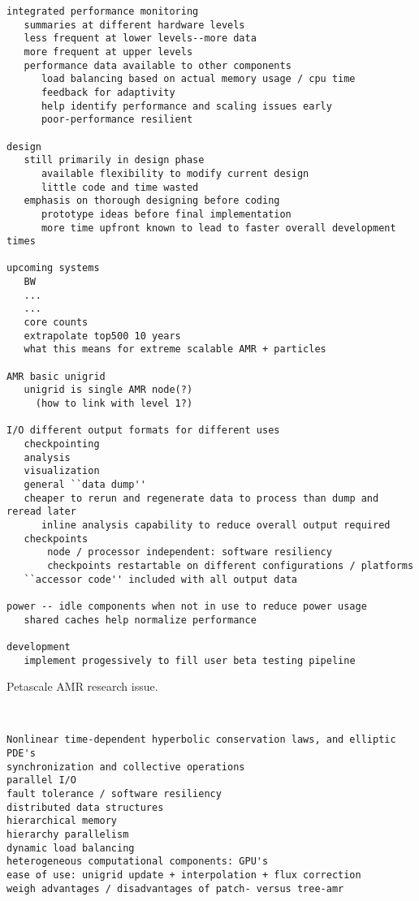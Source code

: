 \documentclass[14pt,letter]{article}
\begin{document}
\begin{verbatim}
integrated performance monitoring
   summaries at different hardware levels
   less frequent at lower levels--more data
   more frequent at upper levels
   performance data available to other components
      load balancing based on actual memory usage / cpu time
      feedback for adaptivity
      help identify performance and scaling issues early
      poor-performance resilient

design
   still primarily in design phase
      available flexibility to modify current design
      little code and time wasted
   emphasis on thorough designing before coding
      prototype ideas before final implementation
      more time upfront known to lead to faster overall development times

upcoming systems
   BW
   ...
   ...
   core counts
   extrapolate top500 10 years
   what this means for extreme scalable AMR + particles

AMR basic unigrid
   unigrid is single AMR node(?)
     (how to link with level 1?)

I/O different output formats for different uses
   checkpointing
   analysis
   visualization
   general ``data dump''
   cheaper to rerun and regenerate data to process than dump and reread later
      inline analysis capability to reduce overall output required
   checkpoints
       node / processor independent: software resiliency
       checkpoints restartable on different configurations / platforms
   ``accessor code'' included with all output data

power -- idle components when not in use to reduce power usage
   shared caches help normalize performance

development
   implement progessively to fill user beta testing pipeline
\end{verbatim}

Petascale AMR research issue.

\ \\ 

\begin{verbatim}
Nonlinear time-dependent hyperbolic conservation laws, and elliptic PDE's
synchronization and collective operations
parallel I/O
fault tolerance / software resiliency
distributed data structures
hierarchical memory
hierarchy parallelism
dynamic load balancing
heterogeneous computational components: GPU's
ease of use: unigrid update + interpolation + flux correction
weigh advantages / disadvantages of patch- versus tree-amr
\end{verbatim}





\end{document}
